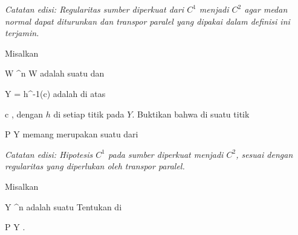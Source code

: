 \emph{Catatan edisi: Regularitas sumber diperkuat dari $C^1$ menjadi $C^2$ agar medan normal dapat diturunkan dan transpor paralel yang dipakai dalam definisi ini terjamin.}

{}
{

Misalkan

\mavergleichskette
{\vergleichskette
{ W
}
{ \subseteq }{ \R^n
}
{  }{
}
{    }{
}
{   }{
}
}
{}{}{}
 { W } { \R
} {}
adalah suatu
dan

\mavergleichskette
{\vergleichskette
{ Y
}
{ = }{ h^{-1}(c)
}
{  }{
}
{    }{
}
{   }{
}
}
{}{}{}
adalah
di atas

\mavergleichskette
{\vergleichskette
{ c
}
{ \in }{ \R
}
{  }{
}
{    }{
}
{   }{
}
}
{}{}{,}
dengan $h$
di setiap titik pada $Y$. Buktikan bahwa
di suatu titik

\mavergleichskette
{\vergleichskette
{ P
}
{ \in }{ Y
}
{  }{
}
{    }{
}
{   }{
}
}
{}{}{}
memang merupakan suatu
dari

\emph{Catatan edisi: Hipotesis $C^1$ pada sumber diperkuat menjadi $C^2$, sesuai dengan regularitas yang diperlukan oleh transpor paralel.}

}
{} {}

{}
{

Misalkan

\mavergleichskette
{\vergleichskette
{ Y
}
{ \subseteq }{ \R^n
}
{  }{
}
{    }{
}
{   }{
}
}
{}{}{}
adalah suatu
Tentukan
di

\mavergleichskette
{\vergleichskette
{ P
}
{ \in }{ Y
}
{  }{
}
{    }{
}
{   }{
}
}
{}{}{.}

}
{} {}


